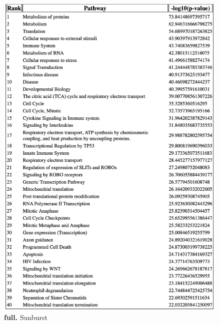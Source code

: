 \documentclass[11pt]{article}
\begin{document}
\begin{figure}[htp]
\begin{center}
\includegraphics[width=0.96\linewidth,clip]{./img/table.png}
\caption{\label{fig:table} {\bf full.} Sunburst}
\end{center}
\end{figure}
\end{document}
